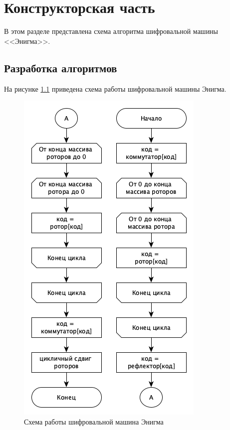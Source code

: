 \chapter{Конструкторская часть}

В этом разделе представлена схема алгоритма шифровальной машины <<Энигма>>.

\section{Разработка алгоритмов}

На рисунке \ref{fig:alg} приведена схема работы шифровальной машины Энигма.


\begin{figure}[ht!]
	\centering
	\includegraphics[width=0.5\linewidth]{img/enigma-algo.png}
	\caption{Схема работы шифровальной машина Энигма}
	\label{fig:alg}
\end{figure}